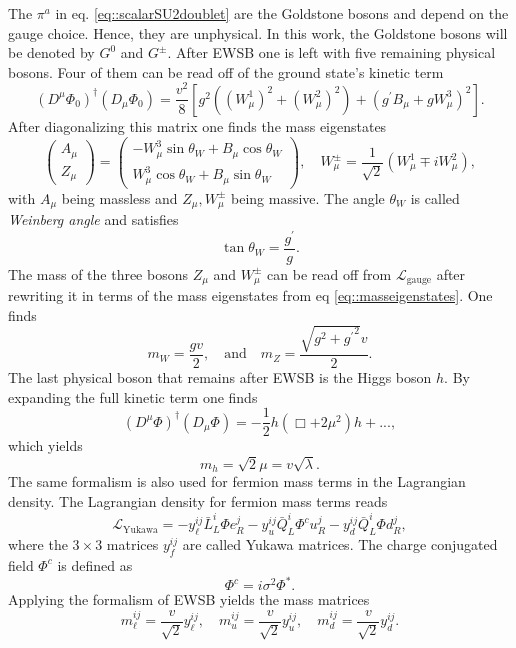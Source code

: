 \documentclass[a4paper,12pt]{book}
\begin{document}
The $\pi^a$ in eq. \eqref{eq::scalarSU2doublet} are the Goldstone bosons and depend on the gauge choice. Hence, they are unphysical. In this work, the Goldstone bosons will be denoted by $G^0$ and $G^\pm$. After EWSB one is left with five remaining physical bosons. Four of them can be read off of the ground state's kinetic term
\begin{equation}
(D^\mu\Phi_0)^\dagger (D_\mu\Phi_0) = \frac{v^2}{8}\left[g^2((W_\mu^1)^2 + (W_\mu^2)^2)+ ({g^\prime} B_\mu + g W_\mu^3)^2\right].
\end{equation}
After diagonalizing this matrix one finds the mass eigenstates
\begin{equation}
\label{eq::masseigenstates}
    \begin{pmatrix}
    	A_\mu\\
    	Z_\mu
	\end{pmatrix} = 
	\begin{pmatrix}
    -W_\mu^3 \sin\theta_W + B_\mu \cos\theta_W      \\
    W_\mu^3 \cos\theta_W + B_\mu \sin\theta_W       
	\end{pmatrix}, \quad W_\mu^\pm = \frac{1}{\sqrt{2}}(W_\mu^1 \mp i W_\mu^2),
\end{equation}
with $A_\mu$ being massless and $Z_\mu, W_\mu^\pm$ being massive. The angle $\theta_W$ is called \textit{Weinberg angle} and satisfies
\begin{equation}
\tan\theta_W = \frac{{g^\prime}}{g}. 
\end{equation}
The mass of the three bosons $Z_\mu$ and $W_\mu^\pm$ can be read off from $\mathcal{L}_\text{gauge}$ after rewriting it in terms of the mass eigenstates from eq \eqref{eq::masseigenstates}. One finds
\begin{equation}
m_W = \frac{g v}{2}, \quad \text{and} \quad m_Z = \frac{\sqrt{g^2 + {g^\prime}^2} v}{2}.
\end{equation}
The last physical boson that remains after EWSB is the Higgs boson $h$. By expanding the full kinetic term one finds
\begin{equation}
(D^\mu\Phi)^\dagger (D_\mu\Phi) = - \frac{1}{2} h(\Box + 2 \mu^2)h + ...,
\end{equation} 
which yields 
\begin{equation}
m_h = \sqrt{2}\mu = v \sqrt{\lambda}.
\end{equation}
The same formalism is also used for fermion mass terms in the Lagrangian density. The Lagrangian density for fermion mass terms reads
\begin{equation}
\label{eq::Lyukawa}
\mathcal{L}_\text{Yukawa} = -y_\ell^{ij}\bar{L}_L^i \Phi e_R^j -y_u^{ij}\bar{Q}_L^i \Phi^c u_R^j -y_d^{ij}\bar{Q}_L^i \Phi d_R^j,
\end{equation}   
where the $3 \times 3$ matrices $y_f^{ij}$ are called Yukawa matrices. The charge conjugated field $\Phi^c$ is defined as 
\begin{equation}
\Phi^c = i\sigma^2 \Phi^*.
\end{equation}
Applying the formalism of EWSB yields the mass matrices 
\begin{equation}
m_\ell^{ij}=\frac{v}{\sqrt{2}}y_\ell^{ij}, \quad m_u^{ij}=\frac{v}{\sqrt{2}}y_u^{ij}, \quad m_d^{ij}=\frac{v}{\sqrt{2}}y_d^{ij}.
\end{equation}
\end{document}
